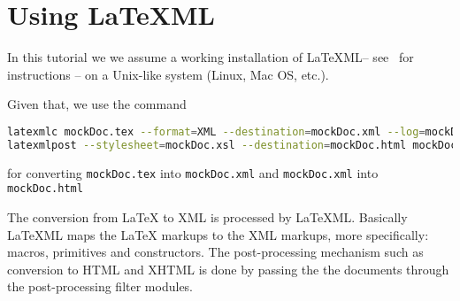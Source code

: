 \documentclass[a4paper]{article}
\def\latexml{{\LaTeX}ML\xspace}
\begin{document}
\section{Using LaTeXML}\label{sec:using}

In this tutorial we we assume a working installation of \latexml -- see~\cite{LaTeXML:get}
for instructions -- on a Unix-like system (Linux, Mac OS, etc.). 

 Given that, we use the
command
\begin{lstlisting}[language=bash]
latexmlc mockDoc.tex --format=XML --destination=mockDoc.xml --log=mockDoc.xml.log 
latexmlpost --stylesheet=mockDoc.xsl --destination=mockDoc.html mockDoc.xml
\end{lstlisting}
for converting \lstinline|mockDoc.tex| into \lstinline|mockDoc.xml| and \lstinline|mockDoc.xml| into
\lstinline|mockDoc.html|


The conversion from {\LaTeX} to XML is processed by \latexml. Basically \latexml maps the
{\LaTeX} markups to the XML markups, more specifically: macros, primitives and
constructors. The post-processing mechanism such as conversion to HTML and XHTML is done by 
passing the the documents through the post-processing filter modules.
\end{document}
